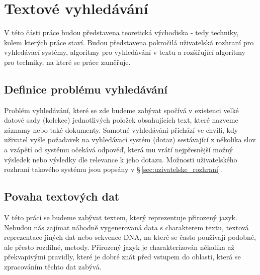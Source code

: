 \documentclass[11pt,letterpaper,oneside,openright]{book}
\begin{document}


\chapter{Textové vyhledávání}
V této části práce budou představena teoretická východiska - tedy techniky,
kolem kterých práce staví. Budou představena pokročilá uživatelská rozhraní pro
vyhledávací systémy, algoritmy pro vyhledávání v textu a rozšiřující algoritmy
pro techniky, na které se práce zaměřuje.

\section{Definice problému vyhledávání}
Problém vyhledávání, které se zde budeme zabývat spočívá v existenci velké
datové sady (kolekce) jednotlivých položek obsahujících text, které nazveme
záznamy nebo také dokumenty. Samotné vyhledávání přichází ve chvíli, kdy
uživatel vyšle požadavek na vyhledávací systém (dotaz) sestávající z několika
slov a vzápětí od systému očekává odpověď, která mu vrátí nejpřesnější možný
výsledek nebo výsledky dle relevance k jeho dotazu. Možnosti uživatelského
rozhraní takového systému jsou popsány v \S\,\ref{sec:uzivatelske_rozhrani}.

\section{Povaha textových dat}
V této práci se budeme zabývat textem, který reprezentuje přirozený jazyk.
Nebudou nás zajímat náhodně vygenerovaná data s charakterem textu, textová
reprezentace jiných dat nebo sekvence DNA, na které se často používají podobné,
ale přesto rozdílné, metody. Přirozený jazyk je charakterizován několika až
překvapivými pravidly, které je dobré znát před vstupem do oblasti, která se
zpracováním těchto dat zabývá.
\end{document}
